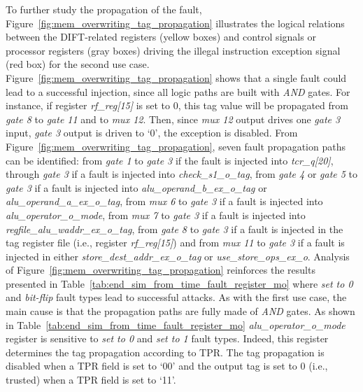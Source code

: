 To further study the propagation of the fault, Figure~\ref{fig:mem_overwriting_tag_propagation} illustrates the logical relations between the DIFT-related registers (yellow boxes) and control signals or processor registers (gray boxes) driving the illegal instruction exception signal (red box) for the second use case. 
Figure~\ref{fig:mem_overwriting_tag_propagation} shows that a single fault could lead to a successful injection, since all logic paths are built with \textit{AND} gates. For instance, if register \textit{rf\_reg[15]} is set to 0, this tag value will be propagated from \textit{gate 8} to \textit{gate 11} and to \textit{mux 12}. Then, since \textit{mux 12} output drives one \textit{gate 3} input, \textit{gate 3} output is driven to `0', the exception is disabled. 
From Figure~\ref{fig:mem_overwriting_tag_propagation}, seven fault propagation paths can be identified: 
from \textit{gate 1} to \textit{gate 3} if the fault is injected into \textit{tcr\_q[20]},
through \textit{gate 3} if a fault is injected into \textit{check\_s1\_o\_tag},
from \textit{gate 4} or \textit{gate 5} to \textit{gate 3} if a fault is injected into \textit{alu\_operand\_b\_ex\_o\_tag} or \textit{alu\_operand\_a\_ex\_o\_tag},
from \textit{mux 6} to \textit{gate 3} if a fault is injected into \textit{alu\_operator\_o\_mode},
from \textit{mux 7} to \textit{gate 3} if a fault is injected into \textit{regfile\_alu\_waddr\_ex\_o\_tag},
from \textit{gate 8} to \textit{gate 3} if a fault is injected in the tag register file (i.e., register \textit{rf\_reg[15]}) and
from \textit{mux 11} to \textit{gate 3} if a fault is injected in either \textit{store\_dest\_addr\_ex\_o\_tag} or \textit{use\_store\_ops\_ex\_o}.
Analysis of Figure~\ref{fig:mem_overwriting_tag_propagation} reinforces the results presented in Table~\ref{tab:end_sim_from_time_fault_register_mo} where \textit{set to 0} and \textit{bit-flip} fault types lead to successful attacks. As with the first use case, the main cause is that the propagation paths are fully made of \textit{AND} gates. As shown in Table~\ref{tab:end_sim_from_time_fault_register_mo} \textit{alu\_operator\_o\_mode} register is sensitive to \textit{set to 0} and \textit{set to 1} fault types. Indeed, this register determines the tag propagation according to TPR. The tag propagation is disabled when a TPR field is set to `00' and the output tag is set to 0 (i.e., trusted) when a TPR field is set to `11'. 


